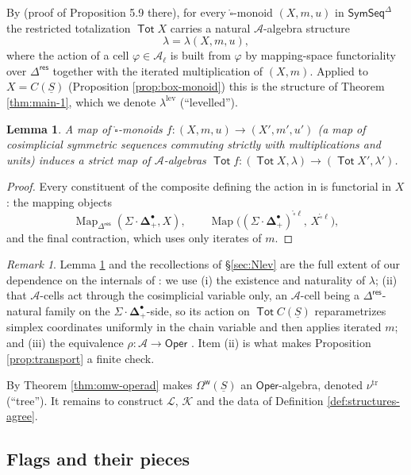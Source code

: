 \documentclass[12pt]{amsart}
\newtheorem{lemma}[subsection]{Lemma}
\theoremstyle{definition}
\theoremstyle{remark}
\newtheorem{remark}[subsection]{Remark}
\newcommand{\Tot}{\operatorname{\mathsf{Tot}}}
\newcommand{\SymSeq}{\mathsf{SymSeq}}
\newcommand{\Oper}{\mathsf{Oper}}
\newcommand{\Map}{\operatorname{Map}}
\newcommand{\boxcirc}{\mathring{\square}}
\newcommand{\SD}{\Sigma{\cdot}\mathbf{\Delta}}
\newcommand{\uS}{\underline{S}}
\newcommand{\Omw}{\Omega^{\mathsf{w}}}           %
\newcommand{\Kop}{\mathcal{K}}                   %
\newcommand{\Lop}{\mathcal{L}}                   %
\newcommand{\Aop}{\mathcal{A}}                   %
\newcommand{\Dres}{\Delta^{\mathsf{res}}}
\begin{document}
By \cite[\S 8.1]{Clark-1} (proof of Proposition 5.9 there), for every $\boxcirc$-monoid $(X, m, u)$ in $\SymSeq^{\Delta}$ the restricted totalization $\Tot X$ carries a natural $\Aop$-algebra structure
\[ \lambda = \lambda(X,m,u), \]
where the action of a cell $\varphi\in \Aop_\ell$ is built from $\varphi$ by mapping-space functoriality over $\Dres$ together with the iterated multiplication of $(X,m)$. Applied to $X = C(\uS)$ (Proposition \ref{prop:box-monoid}) this is the structure of Theorem \ref{thm:main-1}, which we denote $\lambda^{\mathrm{lev}}$ (``levelled'').

\begin{lemma}\label{lem:lambda-natural}
A map of $\boxcirc$-monoids $f\colon (X,m,u)\to (X',m',u')$ (a map of cosimplicial symmetric sequences commuting strictly with multiplications and units) induces a strict map of $\Aop$-algebras $\Tot f\colon (\Tot X, \lambda)\to (\Tot X', \lambda')$.
\end{lemma}

\begin{proof}
Every constituent of the composite defining the action in \cite[\S 8.1]{Clark-1} is functorial in $X$: the mapping objects
\[\Map_{\Dres}(\SD^{\bullet}_+, X), \quad\quad \Map\big((\SD^{\bullet}_+)^{\boxcirc \ell},\, X^{\boxcirc \ell}\big),\]
and the final contraction, which uses only iterates of $m$.
\end{proof}

\begin{remark}\label{rem:clark1-interface}
Lemma \ref{lem:lambda-natural} and the recollections of \S\ref{sec:Nlev} are the full extent of our dependence on the internals of \cite{Clark-1}: we use (i) the existence and naturality of $\lambda$; (ii) that $\Aop$-cells act through the cosimplicial variable only, an $\Aop$-cell being a $\Dres$-natural family on the $\SD^{\bullet}_+$-side, so its action on $\Tot C(\uS)$ reparametrizes simplex coordinates uniformly in the chain variable and then applies iterated $m$; and (iii) the equivalence $\rho\colon \Aop\to \Oper$ \cite[Propositions 7.12, 7.16]{Clark-1}. Item (ii) is what makes Proposition \ref{prop:transport} a finite check.
\end{remark}

By \cite[Proposition 7.12]{Clark-1} Theorem \ref{thm:omw-operad} makes $\Omw(\uS)$ an $\Oper$-algebra, denoted $\nu^{\mathrm{tr}}$ (``tree''). It remains to construct $\Lop$, $\Kop$ and the data of Definition \ref{def:structures-agree}.

\subsection{Flags and their pieces}\label{sec:flags}
\end{document}
